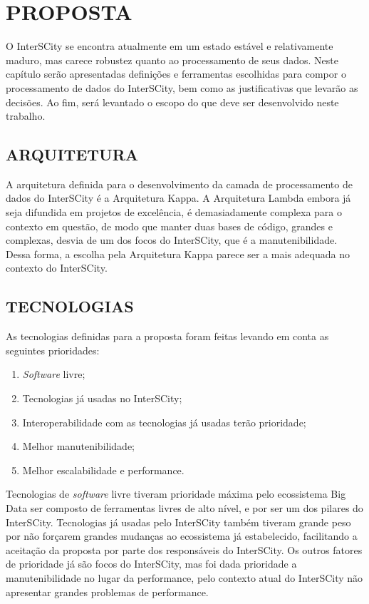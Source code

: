 \chapter[PROPOSTA]{PROPOSTA}

O InterSCity se encontra atualmente em um estado estável e relativamente maduro,
mas carece robustez quanto ao processamento de seus dados. Neste capítulo serão
apresentadas definições e ferramentas escolhidas para compor o processamento
de dados do InterSCity, bem como as justificativas que levarão as decisões. Ao
fim, será levantado o escopo do que deve ser desenvolvido neste trabalho.

\section{ARQUITETURA}

A arquitetura definida para o desenvolvimento da camada de processamento de
dados do InterSCity é a Arquitetura Kappa. A Arquitetura Lambda embora já seja
difundida em projetos de excelência, é demasiadamente complexa para o contexto
em questão, de modo que manter duas bases de código, grandes e complexas,
desvia de um dos focos do InterSCity, que é a manutenibilidade. Dessa forma, a
escolha pela Arquitetura Kappa parece ser a mais adequada no contexto do
InterSCity.

\section{TECNOLOGIAS}

As tecnologias definidas para a proposta foram feitas levando em conta as
seguintes prioridades:

\begin{enumerate}
    \item \textit{Software} livre;
    \item Tecnologias já usadas no InterSCity;
    \item Interoperabilidade com as tecnologias já usadas terão prioridade;
    \item Melhor manutenibilidade;
    \item Melhor escalabilidade e performance.
\end{enumerate}

Tecnologias de \textit{software} livre tiveram prioridade máxima pelo
ecossistema Big Data ser composto de ferramentas livres de alto nível, e por
ser um dos pilares do InterSCity. Tecnologias já usadas pelo InterSCity também
tiveram grande peso por não forçarem grandes mudanças ao ecossistema já
estabelecido, facilitando a aceitação da proposta por parte dos responsáveis do
InterSCity. Os outros fatores de prioridade já são focos do InterSCity,
mas foi dada prioridade a manutenibilidade no lugar da performance, pelo
contexto atual do InterSCity não apresentar grandes problemas de performance.

